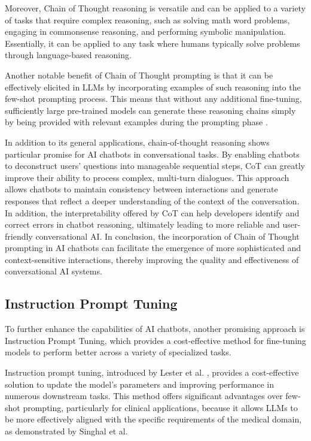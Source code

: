 Moreover, Chain of Thought reasoning is versatile and can be applied to a variety of tasks that require complex reasoning, such as solving math word problems, engaging in commonsense reasoning, and performing symbolic manipulation. Essentially, it can be applied to any task where humans typically solve problems through language-based reasoning.

Another notable benefit of Chain of Thought prompting is that it can be effectively elicited in LLMs by incorporating examples of such reasoning into the few-shot prompting process. This means that without any additional fine-tuning, sufficiently large pre-trained models can generate these reasoning chains simply by being provided with relevant examples during the prompting phase \cite{wei2022chain}.

In addition to its general applications, chain-of-thought reasoning shows particular promise for AI chatbots in conversational tasks. By enabling chatbots to deconstruct users' questions into manageable sequential steps, CoT can greatly improve their ability to process complex, multi-turn dialogues. This approach allows chatbots to maintain consistency between interactions and generate responses that reflect a deeper understanding of the context of the conversation. In addition, the interpretability offered by CoT can help developers identify and correct errors in chatbot reasoning, ultimately leading to more reliable and user-friendly conversational AI. In conclusion, the incorporation of Chain of Thought prompting in AI chatbots can facilitate the emergence of more sophisticated and context-sensitive interactions, thereby improving the quality and effectiveness of conversational AI systems.

\subsection{Instruction Prompt Tuning}

To further enhance the capabilities of AI chatbots, another promising approach is Instruction Prompt Tuning, which provides a cost-effective method for fine-tuning models to perform better across a variety of specialized tasks.

Instruction prompt tuning, introduced by Lester et al. \cite{lester2021power}, provides a cost-effective solution to update the model's parameters and improving performance in numerous downstream tasks. This method offers significant advantages over few-shot prompting, particularly for clinical applications, because it allows LLMs to be more effectively aligned with the specific requirements of the medical domain, as demonstrated by Singhal et al. \cite{singhal2022large}

